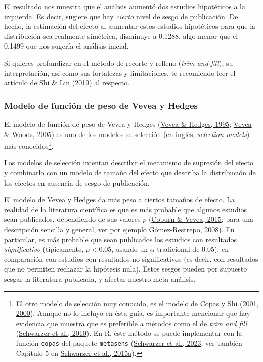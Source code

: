 \documentclass[
  bookmarksnumbered]{article}
\begin{document}
El resultado nos muestra que el análisis aumentó dos estudios hipotéticos a la izquierda. Es decir, sugiere que hay \emph{cierto} nivel de sesgo de publicación. De hecho, la estimación del efecto al aumentar estos estudios hipotéticos para que la distribución sea realmente simétrica, disminuye a 0.1288, algo menor que el 0.1499 que nos sugería el análisis inicial.

Si quieres profundizar en el método de recorte y relleno (\emph{trim and fill}), su interpretación, así como sus fortalezas y limitaciones, te recomiendo leer el artículo de Shi \& Lin (\protect\hyperlink{ref-shiTrimandfill2019}{2019}) al respecto.

\hypertarget{vevea-hedges}{%
\subsubsection{Modelo de función de peso de Vevea y Hedges}\label{vevea-hedges}}

El modelo de función de peso de Vevea y Hedges (\protect\hyperlink{ref-veveaGeneralLinearModel1995}{Vevea \& Hedges, 1995}; \protect\hyperlink{ref-veveaPublicationBiasResearch2005}{Vevea \& Woods, 2005}) es uno de los modelos se selección (en inglés, \emph{selection models}) más conocidos\footnote{El otro modelo de selección muy conocido, es el modelo de Copas y Shi (\protect\hyperlink{ref-copasSensitivityAnalysisPublication2001}{2001}, \protect\hyperlink{ref-copasMetaanalysisFunnelPlots2000}{2000}). Aunque no lo incluyo en ésta guía, es importante mencionar que hay evidencia que muestra que es preferible a métodos como el de \emph{trim and fill} (\protect\hyperlink{ref-schwarzerEmpiricalEvaluationSuggests2010}{Schwarzer et al., 2010}). En R, éste método se puede implementar con la función \texttt{copas} del paquete \texttt{metasens} (\protect\hyperlink{ref-schwarzerMetasensPackage}{Schwarzer et al., 2023}; ver también Capítulo 5 en \protect\hyperlink{ref-schwarzerMetaAnalysis2015}{Schwarzer et al., 2015a}).}.

Los modelos de selección intentan describir el mecanismo de supresión del efecto y combinarlo con un modelo de tamaño del efecto que describa la distribución de los efectos en ausencia de sesgo de publicación.

El modelo de Vevea y Hedges da más peso a ciertos tamaños de efecto. La realidad de la literatura científica es que es más probable que algunos estudios sean publicados, dependiendo de sus valores \(p\) (\protect\hyperlink{ref-coburnPublicationBiasFunction2015}{Coburn \& Vevea, 2015}; para una descripción sencilla y general, ver por ejemplo \protect\hyperlink{ref-SesgoPublicacion2008}{Gómez-Restrepo, 2008}). En particular, es más probable que sean publicados los estudios con resultados \emph{significativo} (típicamente, \(p < 0.05\), usando un \(\alpha\) tradicional de 0.05), en comparación con estudios con resultados no significativos (es decir, con resultados que no permiten rechazar la hipótesis nula). Estos sesgos pueden por supuesto sesgar la literatura publicada, y afectar nuestro meta-análisis.
\end{document}
